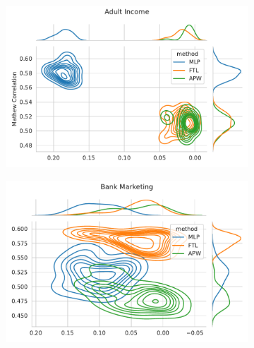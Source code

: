 \begin{figure}
\centering
\caption{Metric distribution optimizing MCC and Statistical Parity in comparison with Fair Transition Loss across multiple resample runs. Corresponding values available at Table~\ref{tab:complete_mcc_parity}.}
\label{fig:complete_mcc_parity}
\begin{subfigure}{.45\linewidth}
    \includegraphics[width=1\linewidth]{images/pareto_mcc_parity_adult.pdf}
\end{subfigure}
\begin{subfigure}{.45\linewidth}
    \includegraphics[width=1\linewidth]{images/pareto_mcc_parity_bank.pdf}
\end{subfigure}


\end{figure}
